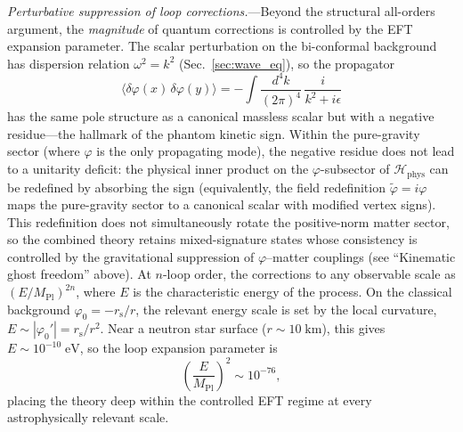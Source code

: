 \documentclass[aps,prd,onecolumn,superscriptaddress,nofootinbib,showpacs,12pt,notitlepage]{revtex4-2}
\newcommand{\Mpl}{M_{\mathrm{Pl}}}
\newcommand{\rs}{r_{\mathrm{s}}}
\begin{document}
\textit{Perturbative suppression of loop corrections.}---Beyond
the structural all-orders argument, the \emph{magnitude} of
quantum corrections is controlled by the EFT expansion
parameter.  The scalar perturbation on the bi-conformal
background has dispersion relation $\omega^2 = k^2$
(Sec.~\ref{sec:wave_eq}), so the propagator
\begin{equation}\label{eq:scalar_prop}
  \langle \delta\varphi(x)\,\delta\varphi(y) \rangle
  = -\int \frac{d^4k}{(2\pi)^4}\,
    \frac{i}{k^2 + i\epsilon}
\end{equation}
has the same pole structure as a canonical massless scalar
but with a negative residue---the hallmark of the phantom
kinetic sign.  Within the pure-gravity sector (where $\varphi$ is the only
propagating mode), the negative residue does not lead to a
unitarity deficit: the physical inner product on the
$\varphi$-subsector of $\mathcal{H}_{\mathrm{phys}}$ can be
redefined by absorbing the sign (equivalently, the field
redefinition $\tilde{\varphi} = i\varphi$ maps the pure-gravity
sector to a canonical scalar with modified vertex signs).
This redefinition does not simultaneously rotate the
positive-norm matter sector, so the combined theory retains
mixed-signature states whose consistency is controlled by
the gravitational suppression of $\varphi$--matter couplings
(see ``Kinematic ghost freedom'' above).  At $n$-loop
order, the corrections to any observable scale as
$(E/\Mpl)^{2n}$, where $E$ is the characteristic energy of
the process.  On the classical background
$\varphi_0 = -\rs/r$, the relevant energy scale is set by
the local curvature, $E \sim |\varphi_0'| = \rs/r^2$.  Near
a neutron star surface ($r \sim 10\;\mathrm{km}$), this gives
$E \sim 10^{-10}\;\mathrm{eV}$, so the loop expansion
parameter is
\begin{equation}\label{eq:loop_suppression}
  \left(\frac{E}{\Mpl}\right)^2
  \sim 10^{-76},
\end{equation}
placing the theory deep within the controlled EFT regime at
every astrophysically relevant scale.
\end{document}

